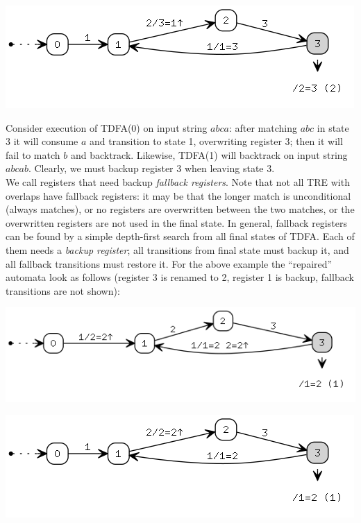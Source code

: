 \documentclass{article}
\newenvironment{Xfig}
    {\par\medskip\noindent\minipage{\linewidth}\begin{center}}
    {\end{center}\endminipage\par\medskip}
\theoremstyle{definition}
\begin{document}
\begin{multicols}{2}
\begin{Xfig}
\includegraphics[width=\linewidth]{img/fallback/tdfa1.png}
\end{Xfig}

Consider execution of TDFA(0) on input string $abca$: after matching $abc$ in state 3 it will consume $a$ and transition to state 1,
overwriting register 3; then it will fail to match $b$ and backtrack.
Likewise, TDFA(1) will backtrack on input string $abcab$.
Clearly, we must backup register 3 when leaving state 3.
\\

We call registers that need backup \emph{fallback registers}.
Note that not all TRE with overlaps have fallback registers:
it may be that the longer match is unconditional (always matches),
or no registers are overwritten between the two matches,
or the overwritten registers are not used in the final state.
In general, fallback registers can be found by a simple depth-first search from all final states of TDFA.
Each of them needs a \emph{backup register};
all transitions from final state must backup it, and all fallback transitions must restore it.
For the above example the ``repaired'' automata look as follows
(register 3 is renamed to 2, register 1 is backup, fallback transitions are not shown):

\begin{Xfig}
\includegraphics[width=\linewidth]{img/fallback/tdfa0_fallback.png}
\end{Xfig}

\begin{Xfig}
\includegraphics[width=\linewidth]{img/fallback/tdfa1_fallback.png}
\end{Xfig}


\end{multicols}
\end{document}
